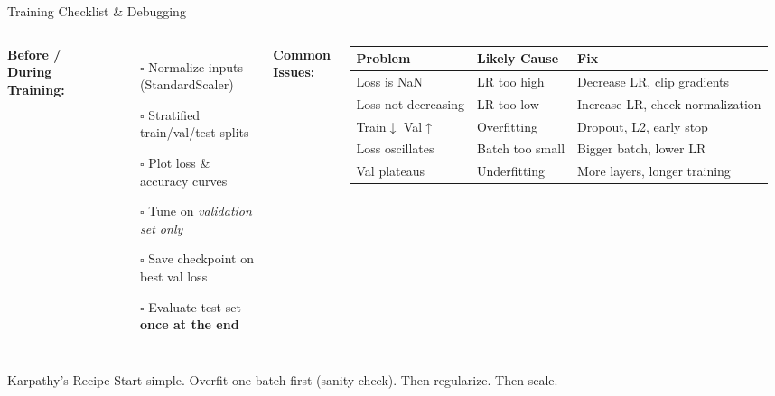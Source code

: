 \documentclass[aspectratio=169]{beamer}
\begin{document}
\begin{frame}{Training Checklist \& Debugging}

\begin{columns}
\textbf{Before / During Training:}
\begin{itemize}
    \item[$\square$] Normalize inputs (StandardScaler)
    \item[$\square$] Stratified train/val/test splits
    \item[$\square$] Plot loss \& accuracy curves
    \item[$\square$] Tune on \emph{validation set only}
    \item[$\square$] Save checkpoint on best val loss
    \item[$\square$] Evaluate test set \textbf{once at the end}
\end{itemize}

\textbf{Common Issues:}

{\scriptsize
\begin{tabular}{@{}p{2cm}p{2.2cm}p{2.5cm}@{}}
\toprule
\textbf{Problem} & \textbf{Likely Cause} & \textbf{Fix} \\
\midrule
Loss is NaN & LR too high & Decrease LR, clip gradients \\
Loss not decreasing & LR too low & Increase LR, check normalization \\
Train$\downarrow$ Val$\uparrow$ & Overfitting & Dropout, L2, early stop \\
Loss oscillates & Batch too small & Bigger batch, lower LR \\
Val plateaus & Underfitting & More layers, longer training \\
\bottomrule
\end{tabular}
}
\end{columns}

\vspace{0.3cm}
\begin{block}{Karpathy's Recipe}
Start simple. Overfit one batch first (sanity check). Then regularize. Then scale.
\end{block}
\end{frame}
\end{document}
